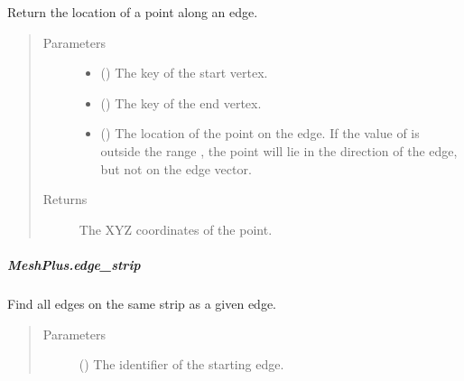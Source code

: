 \documentclass[letterpaper,10pt,english]{sphinxmanual}
\begin{document}
\begin{fulllineitems}
\begin{fulllineitems}
\label{\detokenize{api/generated/directional_clustering.mesh.MeshPlus.edge_point:directional_clustering.mesh.MeshPlus.edge_point}}
Return the location of a point along an edge.
\begin{quote}\begin{description}
\item[{Parameters}] \leavevmode\begin{itemize}
\item {} 
 () \textendash{} The key of the start vertex.

\item {} 
 () \textendash{} The key of the end vertex.

\item {} 
 () \textendash{} The location of the point on the edge.
If the value of  is outside the range , the point will
lie in the direction of the edge, but not on the edge vector.

\end{itemize}

\item[{Returns}] \leavevmode
{} \textendash{} The XYZ coordinates of the point.

\end{description}\end{quote}

\end{fulllineitems}



\subparagraph{MeshPlus.edge\_strip}
\label{\detokenize{api/generated/directional_clustering.mesh.MeshPlus.edge_strip:meshplus-edge-strip}}\label{\detokenize{api/generated/directional_clustering.mesh.MeshPlus.edge_strip::doc}}

\begin{fulllineitems}
\label{\detokenize{api/generated/directional_clustering.mesh.MeshPlus.edge_strip:directional_clustering.mesh.MeshPlus.edge_strip}}
Find all edges on the same strip as a given edge.
\begin{quote}\begin{description}
\item[{Parameters}] \leavevmode
{} () \textendash{} The identifier of the starting edge.


\end{description}
\end{quote}
\end{fulllineitems}
\end{fulllineitems}
\end{document}
